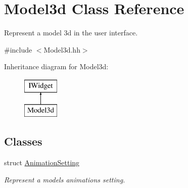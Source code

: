 \hypertarget{classModel3d}{}\section{Model3d Class Reference}
\label{classModel3d}


Represent a model 3d in the user interface.  




{\ttfamily \#include $<$Model3d.\+hh$>$}

Inheritance diagram for Model3d\+:\begin{figure}[H]
\begin{center}
\leavevmode
\includegraphics[height=2.000000cm]{classModel3d}
\end{center}
\end{figure}
\subsection*{Classes}
\begin{DoxyCompactItemize}
\item 
struct \hyperlink{structModel3d_1_1AnimationSetting}{Animation\+Setting}
\begin{DoxyCompactList}\small\item\em Represent a model\textquotesingle{}s animation\textquotesingle{}s setting. \end{DoxyCompactList}\end{DoxyCompactItemize}
